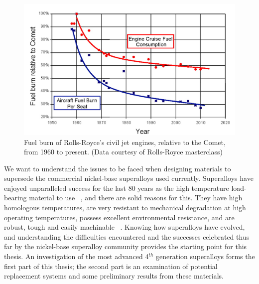 \begin{figure}[htbp]
\begin{center}
\includegraphics{FuelBurn}
\caption{Fuel burn of Rolls-Royce's civil jet engines, relative to the Comet, from 1960 to present. (Data courtesy of Rolls-Royce masterclass)}\label{fig:FuelBurn}
\end{center}
\end{figure}
%

We want to understand the issues to be faced when designing materials to supersede the commercial nickel-base superalloys used currently.  Superalloys have enjoyed unparalleled success for the last 80 years as the high temperature load-bearing material to use ~\cite{reed06}, and there are solid reasons for this.  They have high homologous temperatures, are very resistant to mechanical degradation at high operating temperatures, possess excellent environmental resistance, and are robust, tough and easily machinable ~\cite{betteridge87, sims87}. Knowing how superalloys have evolved, and understanding the difficulties encountered and the successes celebrated thus far by the nickel-base superalloy community provides the starting point for this thesis.  An investigation of the most advanced 4$^{th}$ generation superalloys forms the first part of this thesis; the second part is an examination of potential replacement systems and some preliminary results from these materials. 

